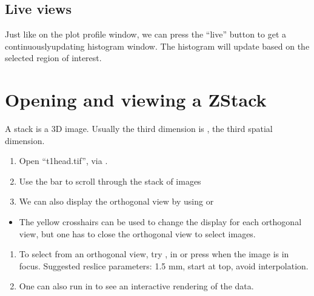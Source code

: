 \documentclass[letterpaper,10pt,english]{jupyterBook}
\begin{document}
\subsection{Live views}
\label{\detokenize{basics:live-views}}
\sphinxAtStartPar
Just like on the plot profile window, we can press the “live” button to get a continuously\sphinxhyphen{}updating histogram window. The histogram will update based on the selected region of interest.


\section{Opening and viewing a Z\sphinxhyphen{}Stack}
\label{\detokenize{basics:opening-and-viewing-a-z-stack}}
\sphinxAtStartPar
A stack is a 3D image. Usually the third dimension is , the third spatial dimension.
\begin{enumerate}
%
\item {} 
\sphinxAtStartPar
Open “t1\sphinxhyphen{}head.tif”, via .

\item {} 
\sphinxAtStartPar
Use the bar to scroll through the stack of images

\item {} 
\sphinxAtStartPar
We can also display the orthogonal view by using 
or 

\end{enumerate}
\begin{itemize}
\item {} 
\sphinxAtStartPar
The yellow crosshairs can be used to change the display for each orthogonal
view, but one has to close the orthogonal view to select images.

\end{itemize}
\begin{enumerate}
%
\setcounter{enumi}{3}
\item {} 
\sphinxAtStartPar
To select from an orthogonal view, try , in  or press  when the image is in focus.
Suggested reslice parameters: 1.5 mm, start at top, avoid interpolation.

\item {} 
\sphinxAtStartPar
One can also run  in  to see an interactive rendering of the data.

\end{enumerate}
\end{document}
